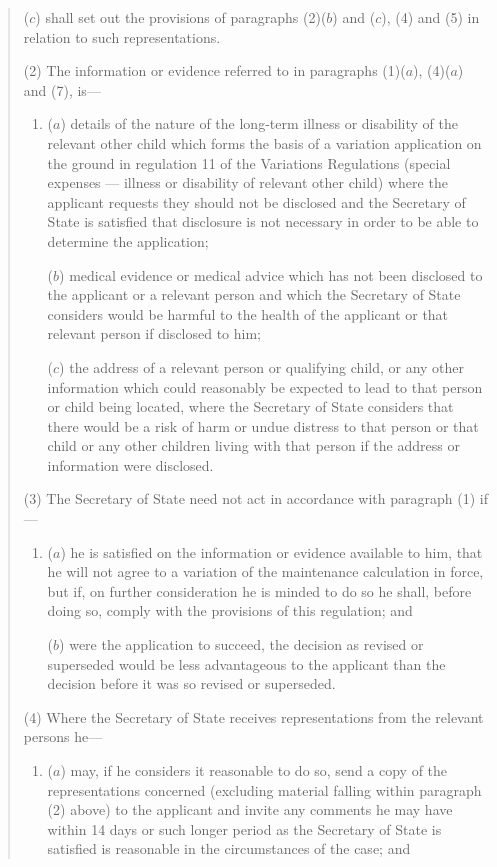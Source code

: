 \documentclass[12pt,a4paper]{article}
\begin{document}
\begin{quotation}
\begin{enumerate}
($c$) shall set out the provisions of paragraphs (2)($b$)  and ($c$), (4) and (5) in relation to such representations.
\end{enumerate}

(2) The information or evidence referred to in paragraphs (1)($a$), (4)($a$)  and (7), is—
\begin{enumerate}\item[]
($a$) details of the nature of the long-term illness or disability of the relevant other child which forms the basis of a variation application on the ground in regulation 11 of the Variations Regulations (special expenses — illness or disability of relevant other child) where the applicant requests they should not be disclosed and the Secretary of State is satisfied that disclosure is not necessary in order to be able to determine the application;

($b$) medical evidence or medical advice which has not been disclosed to the applicant or a relevant person and which the Secretary of State considers would be harmful to the health of the applicant or that relevant person if disclosed to him;

($c$) the address of a relevant person or qualifying child, or any other information which could reasonably be expected to lead to that person or child being located, where the Secretary of State considers that there would be a risk of harm or undue distress to that person or that child or any other children living with that person if the address or information were disclosed.
\end{enumerate}

(3) The Secretary of State need not act in accordance with paragraph (1) if—
\begin{enumerate}\item[]
($a$) he is satisfied on the information or evidence available to him, that he will not agree to a variation of the maintenance calculation in force, but if, on further consideration he is minded to do so he shall, before doing so, comply with the provisions of this regulation; and

($b$) were the application to succeed, the decision as revised or superseded would be less advantageous to the applicant than the decision before it was so revised or superseded.
\end{enumerate}

(4) Where the Secretary of State receives representations from the relevant persons he—
\begin{enumerate}\item[]
($a$) may, if he considers it reasonable to do so, send a copy of the representations concerned (excluding material falling within paragraph (2) above) to the applicant and invite any comments he may have within 14 days or such longer period as the Secretary of State is satisfied is reasonable in the circumstances of the case; and


\end{enumerate}
\end{quotation}
\end{document}
